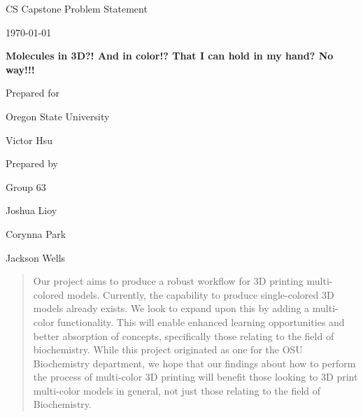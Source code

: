 \documentclass[onecolumn, draftclsnofoot,10pt, compsoc]{IEEEtran}
\def \CapstoneTeamName{		The Cleverly Named Team}
\def \CapstoneTeamNumber{		63}
\def \GroupMemberOne{			Joshua Lioy}
\def \GroupMemberTwo{			Corynna Park}
\def \GroupMemberThree{			Jackson Wells}
\def \CapstoneProjectName{		Molecules in 3D?! And in color!? That I can hold in my hand? No way!!!}
\def \CapstoneSponsorCompany{		Oregon State University}
\def \CapstoneSponsorPerson{		Victor Hsu}
\def \DocType{			Problem Statement
				}
\newcommand{\NameSigPair}[1]{\par
\makebox[2.75in][r]{#1} \hfil 	\makebox[3.25in]{\makebox[2.25in]{\hrulefill} \hfill		\makebox[.75in]{\hrulefill}}
\par\vspace{-12pt} \textit{\tiny\noindent
\makebox[2.75in]{} \hfil		\makebox[3.25in]{\makebox[2.25in][r]{Signature} \hfill	\makebox[.75in][r]{Date}}}}
\renewcommand{\NameSigPair}[1]{#1}
\begin{document}
\begin{titlepage}
    \begin{singlespace}
        \hfill 
        \par\vspace{.2in}
        \centering
        \scshape{
            \huge CS Capstone \DocType \par
            {\large\today}\par
            \vspace{.5in}
            \textbf{\Huge\CapstoneProjectName}\par
            \vfill
            {\large Prepared for}\par
            \Huge \CapstoneSponsorCompany\par
            \vspace{5pt}
            {\Large\NameSigPair{\CapstoneSponsorPerson}\par}
            {\large Prepared by }\par
            Group\CapstoneTeamNumber\par
            \vspace{5pt}
            {\Large
                \NameSigPair{\GroupMemberOne}\par
                \NameSigPair{\GroupMemberTwo}\par
                \NameSigPair{\GroupMemberThree}\par
            }
            \vspace{20pt}
        }
        \begin{abstract}
	    Our project aims to produce a robust workflow for 3D printing multi-colored models. 
	    Currently, the capability to produce single-colored 3D models already exists. 
	    We look to expand upon this by adding a multi-color functionality.
	    This will enable enhanced learning opportunities and better absorption of concepts, specifically those relating to the field of biochemistry. 
	    While this project originated as one for the OSU Biochemistry department, we hope that our findings about how to perform the process of multi-color 3D printing will benefit those looking to 3D print multi-color models in general, not just those relating to the field of Biochemistry.


\end{abstract}
\end{singlespace}
\end{titlepage}
\end{document}
